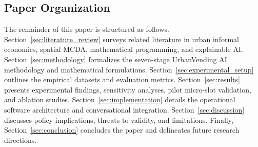 \subsection{Paper Organization}
\label{sec:org}

The remainder of this paper is structured as follows. Section~\ref{sec:literature_review} surveys related literature in urban informal economics, spatial MCDA, mathematical programming, and explainable AI. Section~\ref{sec:methodology} formalizes the seven-stage UrbanVending AI methodology and mathematical formulations. Section~\ref{sec:experimental_setup} outlines the empirical datasets and evaluation metrics. Section~\ref{sec:results} presents experimental findings, sensitivity analyses, pilot micro-slot validation, and ablation studies. Section~\ref{sec:implementation} details the operational software architecture and conversational integration. Section~\ref{sec:discussion} discusses policy implications, threats to validity, and limitations. Finally, Section~\ref{sec:conclusion} concludes the paper and delineates future research directions.
